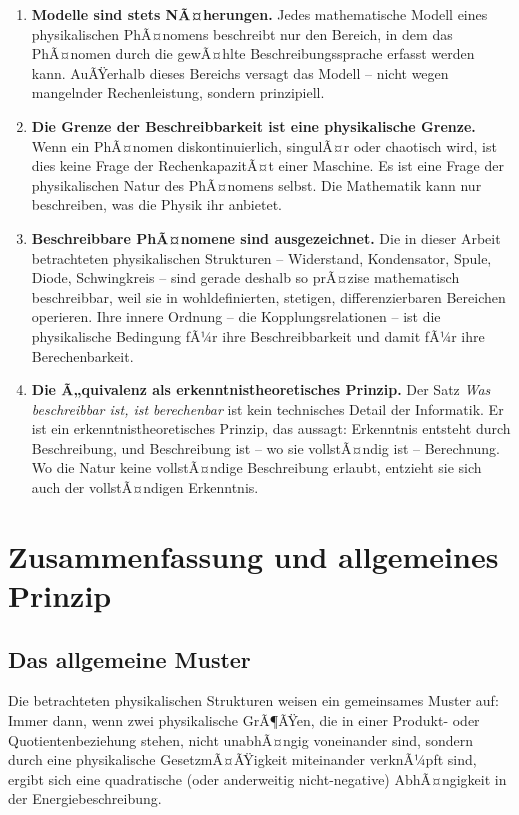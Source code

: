﻿\documentclass[12pt, a4paper]{article}
\begin{document}
	\begin{enumerate}
		\item \textbf{Modelle sind stets NÃ¤herungen.} Jedes mathematische Modell eines physikalischen PhÃ¤nomens beschreibt nur den Bereich, in dem das PhÃ¤nomen durch die gewÃ¤hlte Beschreibungssprache erfasst werden kann. AuÃŸerhalb dieses Bereichs versagt das Modell -- nicht wegen mangelnder Rechenleistung, sondern prinzipiell.
		\item \textbf{Die Grenze der Beschreibbarkeit ist eine physikalische Grenze.} Wenn ein PhÃ¤nomen diskontinuierlich, singulÃ¤r oder chaotisch wird, ist dies keine Frage der RechenkapazitÃ¤t einer Maschine. Es ist eine Frage der physikalischen Natur des PhÃ¤nomens selbst. Die Mathematik kann nur beschreiben, was die Physik ihr anbietet.
		\item \textbf{Beschreibbare PhÃ¤nomene sind ausgezeichnet.} Die in dieser Arbeit betrachteten physikalischen Strukturen -- Widerstand, Kondensator, Spule, Diode, Schwingkreis -- sind gerade deshalb so prÃ¤zise mathematisch beschreibbar, weil sie in wohldefinierten, stetigen, differenzierbaren Bereichen operieren. Ihre innere Ordnung -- die Kopplungsrelationen -- ist die physikalische Bedingung fÃ¼r ihre Beschreibbarkeit und damit fÃ¼r ihre Berechenbarkeit.
		\item \textbf{Die Ã„quivalenz als erkenntnistheoretisches Prinzip.} Der Satz \textit{Was beschreibbar ist, ist berechenbar} ist kein technisches Detail der Informatik. Er ist ein erkenntnistheoretisches Prinzip, das aussagt: Erkenntnis entsteht durch Beschreibung, und Beschreibung ist -- wo sie vollstÃ¤ndig ist -- Berechnung. Wo die Natur keine vollstÃ¤ndige Beschreibung erlaubt, entzieht sie sich auch der vollstÃ¤ndigen Erkenntnis.
	\end{enumerate}

	\section{Zusammenfassung und allgemeines Prinzip}
	
	\subsection{Das allgemeine Muster}
	
	Die betrachteten physikalischen Strukturen weisen ein gemeinsames Muster auf: Immer dann, wenn zwei physikalische GrÃ¶ÃŸen, die in einer Produkt- oder Quotientenbeziehung stehen, nicht unabhÃ¤ngig voneinander sind, sondern durch eine physikalische GesetzmÃ¤ÃŸigkeit miteinander verknÃ¼pft sind, ergibt sich eine quadratische (oder anderweitig nicht-negative) AbhÃ¤ngigkeit in der Energiebeschreibung.
	
\end{document}
